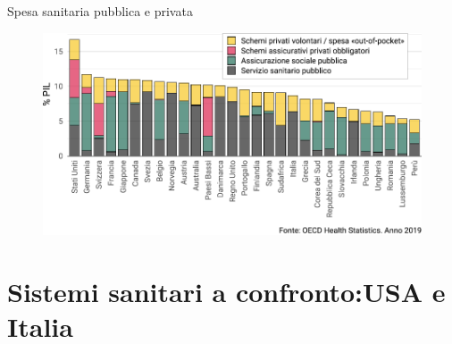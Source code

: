 \documentclass[aspectratio=64,12pt]{beamer}
\begin{document}
\begin{frame}{Spesa sanitaria pubblica e privata}
\begin{figure}[htbp]
\centering
\includegraphics[width=.95\textwidth]{./figure/spesa-sanitaria-per-schema-color.pdf}
\end{figure}
\end{frame}

\section{Sistemi sanitari a confronto:\newline USA e Italia}
\end{document}
